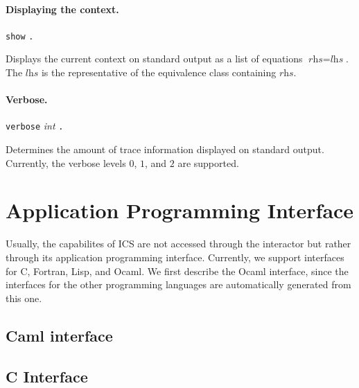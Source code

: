 \documentclass[12pt]{article}
\begin{document}
\paragraph{Displaying the context.}
  \begin{center}
  \texttt{show} \texttt{.}
  \end{center}
Displays the current context on standard output as a list of
equations $\textit{rhs} = \textit{lhs}$\@.  The $\textit{lhs}$
is the representative of the equivalence class containing $\textit{rhs}$\@.

\paragraph{Verbose.}
  \begin{center}
  \texttt{verbose} \textit{int} \texttt{.}
  \end{center}
Determines the amount of trace information displayed on standard output.
Currently, the verbose levels $0$, $1$, and $2$ are supported.



\section{Application Programming Interface}\label{sec:api}

Usually, the capabilites of ICS are not accessed through the interactor
but rather through its application programming interface.  Currently,
we support interfaces for C, Fortran, Lisp, and Ocaml.  We
first describe the Ocaml interface, since the interfaces for the
other programming languages are automatically generated from this one.

\subsection{Caml interface}

 

\subsection{C Interface}
\end{document}
